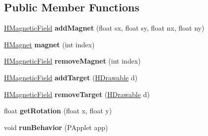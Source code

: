 \subsection*{Public Member Functions}
\begin{DoxyCompactItemize}
\item 
\hypertarget{classhype_1_1behavior_1_1_h_magnetic_field_a21df091feb3f8134f3aee78ef4d98bb6}{\hyperlink{classhype_1_1behavior_1_1_h_magnetic_field}{H\-Magnetic\-Field} {\bfseries add\-Magnet} (float sx, float sy, float nx, float ny)}\label{classhype_1_1behavior_1_1_h_magnetic_field_a21df091feb3f8134f3aee78ef4d98bb6}

\item 
\hypertarget{classhype_1_1behavior_1_1_h_magnetic_field_ad531d161393d9bc00ab67fa840a79798}{\hyperlink{classhype_1_1behavior_1_1_h_magnetic_field_1_1_h_magnet}{H\-Magnet} {\bfseries magnet} (int index)}\label{classhype_1_1behavior_1_1_h_magnetic_field_ad531d161393d9bc00ab67fa840a79798}

\item 
\hypertarget{classhype_1_1behavior_1_1_h_magnetic_field_a4940ac844de98bef6834b97b9ae81bdc}{\hyperlink{classhype_1_1behavior_1_1_h_magnetic_field}{H\-Magnetic\-Field} {\bfseries remove\-Magnet} (int index)}\label{classhype_1_1behavior_1_1_h_magnetic_field_a4940ac844de98bef6834b97b9ae81bdc}

\item 
\hypertarget{classhype_1_1behavior_1_1_h_magnetic_field_a042ded466ff5b9ccd0746d4b8faabacb}{\hyperlink{classhype_1_1behavior_1_1_h_magnetic_field}{H\-Magnetic\-Field} {\bfseries add\-Target} (\hyperlink{classhype_1_1drawable_1_1_h_drawable}{H\-Drawable} d)}\label{classhype_1_1behavior_1_1_h_magnetic_field_a042ded466ff5b9ccd0746d4b8faabacb}

\item 
\hypertarget{classhype_1_1behavior_1_1_h_magnetic_field_af3af967e4ab6e1671994bb73f624ebe6}{\hyperlink{classhype_1_1behavior_1_1_h_magnetic_field}{H\-Magnetic\-Field} {\bfseries remove\-Target} (\hyperlink{classhype_1_1drawable_1_1_h_drawable}{H\-Drawable} d)}\label{classhype_1_1behavior_1_1_h_magnetic_field_af3af967e4ab6e1671994bb73f624ebe6}

\item 
\hypertarget{classhype_1_1behavior_1_1_h_magnetic_field_ab753eb97970c81aa3654606b2635743b}{float {\bfseries get\-Rotation} (float x, float y)}\label{classhype_1_1behavior_1_1_h_magnetic_field_ab753eb97970c81aa3654606b2635743b}

\item 
\hypertarget{classhype_1_1behavior_1_1_h_magnetic_field_ae48e7966cb683687cd6a05ea8319ecbd}{void {\bfseries run\-Behavior} (P\-Applet app)}\label{classhype_1_1behavior_1_1_h_magnetic_field_ae48e7966cb683687cd6a05ea8319ecbd}


\end{DoxyCompactItemize}
